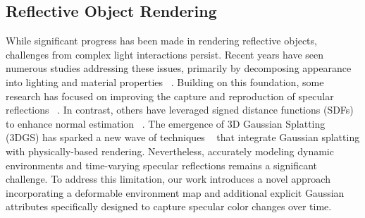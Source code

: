 \subsection{Reflective Object Rendering}
While significant progress has been made in rendering reflective objects, challenges from complex light interactions persist. Recent years have seen numerous studies addressing these issues, primarily by decomposing appearance into lighting and material properties ~\citep{bi2020neural, boss2021neuralpil,li2022neural, srinivasan2020nerv, Zhang_2021, Munkberg_2022_CVPR,zhang2021physg,verbin2024eclipse,zhao2024illuminerf}. Building on this foundation, some research has focused on improving the capture and reproduction of specular reflections ~\citep{verbin2022ref, ma2023specnerf, verbin2024nerf, ye20243d}. In contrast, others have leveraged signed distance functions (SDFs) to enhance normal estimation ~\citep{ge2023refneus, liang2023envidr, liang2023spidr, liu2023nero, zhang2023neilf}.
The emergence of 3D Gaussian Splatting (3DGS) has sparked a new wave of techniques ~\citep{jiang2023gaussianshader,liang2023gs,yang2024specgaussian,zhu2024gs,gao2023relightable,shi2023gir} that integrate Gaussian splatting with physically-based rendering. Nevertheless, accurately modeling dynamic environments and time-varying specular reflections remains a significant challenge. To address this limitation, our work introduces a novel approach incorporating a deformable environment map and additional explicit Gaussian attributes specifically designed to capture specular color changes over time.
